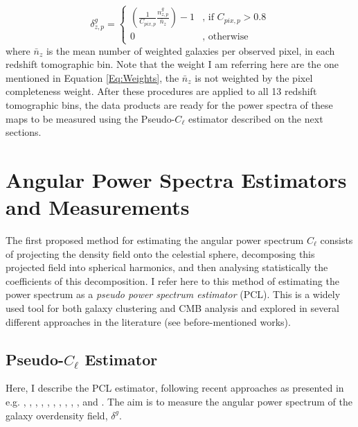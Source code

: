 \begin{equation}
\delta_{z,p}^g = 
\begin{cases}
\left(\frac{1}{C_{pix,p}}\frac{n^g_{z,p}}{\bar{n}_z}\right) - 1 & \text{, if } C_{pix,p} > 0.8 \\
0 & \text{, otherwise}
\end{cases}
\label{Eq:OverDMaps}
\end{equation}
where $\bar{n}_z$ is the mean number of weighted galaxies per observed pixel, in each redshift tomographic bin. Note that the weight I am referring here are the one mentioned in Equation \ref{Eq:Weights}, the $\bar{n}_z$ is not weighted by the pixel completeness weight.  After these procedures are applied to all 13 redshift tomographic bins, the data products are ready for the power spectra of these maps to be measured using the Pseudo-$C_{\ell}$ estimator described on the next sections.

\section{Angular Power Spectra Estimators and Measurements}\label{Sec:Measurements}
The first proposed method for estimating the angular power spectrum $C_{\ell}$  \citep{Peebles1973} consists of projecting the density field onto the celestial sphere, decomposing this projected field into spherical harmonics, and then analysing statistically the coefficients of this decomposition. I refer here to this method of estimating the power spectrum as a \textit{pseudo power spectrum estimator} (PCL). This is a widely used tool for both galaxy clustering and CMB analysis and explored in several different approaches in the literature (see before-mentioned works).

\subsection{Pseudo-$C_{\ell}$ Estimator}\label{Ref:PCL}

Here, I describe the PCL estimator, following recent approaches as presented in e.g. \cite{ScharfLahav1992}, \cite{FisherLahav1994}, \cite{Wright1994}, \cite{2001Huterer}, \cite{PolSpice2001}, \cite{BlakeFerreira2004}, \cite{Blake2007}, \cite{Thomas2010Neutr}, \cite{Thomas2011b}, \cite{Thomas2011}, and \cite{Ho2012}. The aim is to measure the angular power spectrum of the galaxy overdensity field, $\delta^g$. 

